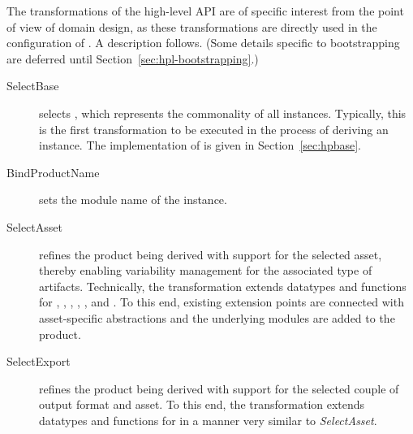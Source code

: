 The transformations of the high-level API are of specific interest from the point of view of domain design, as these transformations are directly used in the configuration of \hpl. A description follows. (Some details specific to bootstrapping are deferred until Section~\ref{sec:hpl-bootstrapping}.)

\begin{description}

\item[SelectBase] selects \hpbase{}, which represents the commonality of all \hpl{} instances.
Typically, this is the first transformation to be executed in the process of deriving an instance. The implementation of \hpbase{} is given in Section~\ref{sec:hpbase}.

\item[BindProductName] sets the module name of the \hpl{} instance.

\item[SelectAsset] refines the product being derived with support for the selected asset, thereby enabling variability management for the associated type of artifacts. Technically, the transformation extends datatypes and functions for \assetr, \assetx, \asseti, \assetc, \emptyi, and \ckparser. To this end, existing extension points are connected with asset-specific abstractions and the underlying modules are added to the product.

\item[SelectExport] refines the product being derived with support for the selected couple of output format and asset. To this end, the transformation extends datatypes and functions for \asseto{} in a manner very similar to \emph{SelectAsset}. 

\end{description}


